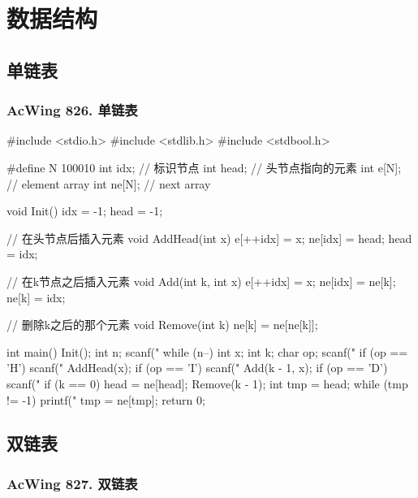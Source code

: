 \chapter{数据结构}

\section{单链表}
\subsection{AcWing 826. 单链表}

\begin{mycpptwocol}
	#include <stdio.h>
	#include <stdlib.h>
	#include <stdbool.h>
	
	#define N 100010
	int idx; // 标识节点
	int head; // 头节点指向的元素
	int e[N]; // element array
	int ne[N]; // next array
	
	void Init()
	{
	    idx = -1;
	    head = -1;
	}
	
	// 在头节点后插入元素
	void AddHead(int x) {
	    e[++idx] = x;
	    ne[idx] = head;
	    head = idx;
	}
	
	// 在k节点之后插入元素
	void Add(int k, int x)
	{
	    e[++idx] = x;
	    ne[idx] = ne[k];
	    ne[k] = idx;
	}
	
	// 删除k之后的那个元素
	void Remove(int k) {
	    ne[k] = ne[ne[k]];
	}
	
	int main()
	{
	    Init();
	    int n;
	    scanf("%
	    while (n--) {
	        int x;
	        int k;
	        char op;
	        scanf(" %
	        if (op == 'H') {
	            scanf("%
	            AddHead(x);
	        }
	        if (op == 'I') {
	            scanf("%
	            Add(k - 1, x);
	        }
	        if (op == 'D') {
	            scanf("%
	            if (k == 0) {
	                head = ne[head];
	            }
	            Remove(k - 1);
	        }
	    }
	    int tmp = head;
	    while (tmp != -1) {
	        printf("%
	        tmp = ne[tmp];
	    }
	    return 0;
		}
\end{mycpptwocol}

\section{双链表}

\subsection{AcWing 827. 双链表}


